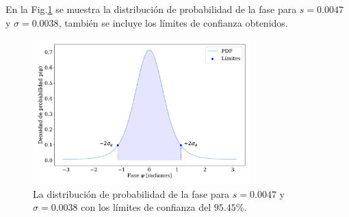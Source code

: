 En la Fig.\ref{fig:phase_prob_ej} se muestra la distribución de probabilidad de la fase para $s=0.0047$ y $\sigma = 0.0038$, también se incluye los límites de confianza obtenidos.

\begin{figure}[H]
    \begin{small}
        \begin{center}
            \includegraphics[width=0.75\textwidth]{phase_prob_ej.pdf}
        \end{center}
        \caption{La distribución de probabilidad de la fase para $s=0.0047$ y $\sigma = 0.0038$ con los límites de confianza del $95.45\%$.}
        \label{fig:phase_prob_ej}
    \end{small}
\end{figure}